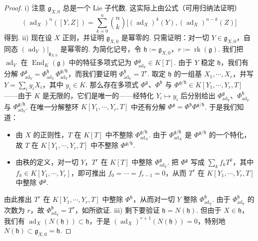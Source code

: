 \begin{proof}
i) 注意 $\mathfrak g_{X,0}$ 总是一个 Lie 子代数. 这实际上由公式（可用归纳法证明）
\[
(\operatorname{ad}_{X})^{n}([Y,Z])=\sum_{k=0}^{n}\binom{n}{k}\bigl[(\operatorname{ad}_{X})^{k}(Y),(\operatorname{ad}_{X})^{n-k}(Z)\bigr]
\]
得到.
ii) 现在设 $X$ 正则，并证明 $\mathfrak g_{X,0}$ 是幂零的. 只需证明：对一切 $Y\in\mathfrak g_{X,0}$，自同态 $(\operatorname{ad}_{Y})|_{\mathfrak g_{X,0}}$ 是幂零的. 为简化记号，令 $\mathfrak h:=\mathfrak g_{X,0}$，$r:=\operatorname{rk}(\mathfrak g)$. 我们把 $\operatorname{ad}_{Y}$ 在 $\operatorname{End}_{K}(\mathfrak g)$ 中的特征多项式记为 $\Phi^{\mathfrak g}_{\operatorname{ad}_{Y}}\in K[T]$. 由于 $Y$ 稳定 $\mathfrak h$，我们有分解 $\Phi^{\mathfrak g}_{\operatorname{ad}_{Y}}=\Phi^{\mathfrak h}_{\operatorname{ad}_{Y}}\,\Phi^{\mathfrak g/\mathfrak h}_{\operatorname{ad}_{Y}}$，而我们要证明 $\Phi^{\mathfrak h}_{\operatorname{ad}_{Y}}=T^{r}$. 取定 $\mathfrak h$ 的一组基 $X_{1},\cdots,X_{r}$，并写 $Y=\sum_{i}y_{i}X_{i}$，其中 $y_{i}\in K$. 那么存在多项式 $\Phi^{\mathfrak g}$、$\Phi^{\mathfrak h}$ 与 $\Phi^{\mathfrak g/\mathfrak h}\in K[Y_{1},\cdots,Y_{r},T]$——由于 $K$ 是无限的，它们是唯一的——经特化 $Y_{i}\mapsto y_{i}$ 后分别给出 $\Phi^{\mathfrak g}_{\operatorname{ad}_{Y}}$、$\Phi^{\mathfrak h}_{\operatorname{ad}_{Y}}$ 与 $\Phi^{\mathfrak g/\mathfrak h}_{\operatorname{ad}_{Y}}$. 在唯一分解整环 $K[Y_{1},\cdots,Y_{r},T]$ 中还有分解 $\Phi^{\mathfrak g}=\Phi^{\mathfrak h}\Phi^{\mathfrak g/\mathfrak h}$. 于是我们知道：
\begin{itemize}
\item 由 $X$ 的正则性，$T$ 在 $K[T]$ 中不整除 $\Phi^{\mathfrak g/\mathfrak h}_{\operatorname{ad}_{X}}$. 由于 $\Phi^{\mathfrak g/\mathfrak h}_{\operatorname{ad}_{X}}$ 是 $\Phi^{\mathfrak g/\mathfrak h}$ 的一个特化，故 $T$ 在 $K[Y_{1},\cdots,Y_{r},T]$ 中不整除 $\Phi^{\mathfrak g/\mathfrak h}$.
\item 由秩的定义，对一切 $Y$，$T^{r}$ 在 $K[T]$ 中整除 $\Phi^{\mathfrak g}_{\operatorname{ad}_{Y}}$. 把 $\Phi^{\mathfrak g}$ 写成 $\sum_{k}f_{k}T^{k}$，其中 $f_{k}\in K[Y_{1},\cdots,Y_{r}]$，即可推出 $f_{0}=\cdots=f_{r-1}=0$，从而 $T^{r}$ 在 $K[Y_{1},\cdots,Y_{r},T]$ 中整除 $\Phi^{\mathfrak g}$.
\end{itemize}
由此推出 $T^{r}$ 在 $K[Y_{1},\cdots,Y_{r},T]$ 中整除 $\Phi^{\mathfrak h}$，从而对一切 $Y$ 整除 $\Phi^{\mathfrak h}_{\operatorname{ad}_{Y}}$. 由于 $\Phi^{\mathfrak h}_{\operatorname{ad}_{Y}}$ 的次数为 $r$，故 $\Phi^{\mathfrak h}_{\operatorname{ad}_{Y}}=T^{r}$，如所欲证.
iii) 剩下要验证 $\mathfrak h=N(\mathfrak h)$. 但由于 $X\in\mathfrak h$，我们有 $\operatorname{ad}_{X}(N(\mathfrak h))\subset\mathfrak h$，于是 $(\operatorname{ad}_{X})^{r+1}(N(\mathfrak h))=0$，特别地 $N(\mathfrak h)\subset\mathfrak g_{X,0}=\mathfrak h$.
\end{proof}
